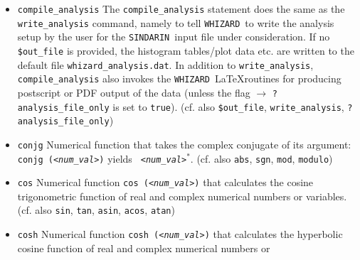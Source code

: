 \documentclass[12pt]{book}
\newcommand{\ttt}[1]{\texttt{#1}}
\newcommand{\whizard}{\ttt{WHIZARD}}
\newcommand{\sindarin}{\ttt{SINDARIN}}
\begin{document}
\begin{itemize}
\ttt{compile} \newline
The \ttt{compile ()} command has no arguments (the parentheses can
also been left out: /\ttt{compile ()}. The command is optional, it
invokes the compilation of the process(es) (i.e. the matrix element
file(s)) to be compiled as a shared library. This shared object file
has the standard name \ttt{default\_lib.so} and resides in the
\ttt{.libs} subdirectory of the corresponding user workspace. If the
user has defined a different library name \ttt{lib\_name} with the
\ttt{library} command, then WHIZARD compiles this as the shared object
\ttt{.libs/lib\_name.so}. (This allows to split process classes and to
avoid too large libraries.)
Another possibility is to use the command \ttt{compile as
  "static\_name"}. This will compile and link the process library in a
static way and create the static executable \ttt{static\_name} in the
user workspace. (cf. also \ttt{library})
\item
\ttt{compile\_analysis} \newline
The \ttt{compile\_analysis} statement does the same as
the \ttt{write\_analysis} command, namely to tell \whizard\ to write
the analysis setup by the user for the \sindarin\ input file under
consideration. If no \ttt{\$out\_file} is provided, the histogram
tables/plot data etc. are written to the default file
\ttt{whizard\_analysis.dat}. In addition to \ttt{write\_analysis},
\ttt{compile\_analysis} also invokes the \whizard\ \LaTeX routines for
producing postscript or PDF output of the data (unless the flag
$\rightarrow$ \ttt{?analysis\_file\_only} is set to \ttt{true}).
(cf. also \ttt{\$out\_file}, \ttt{write\_analysis},
\ttt{?analysis\_file\_only})
\item
\ttt{conjg} \newline
Numerical function that takes the complex conjugate of its argument:
\ttt{conjg ({\em <num\_val>})} yields \ttt{{\em
<num\_val>}$^\ast$}. (cf. also \ttt{abs}, \ttt{sgn}, \ttt{mod}, \ttt{modulo})
\item
\ttt{cos} \newline
Numerical function \ttt{cos ({\em <num\_val>})} that calculates the
cosine trigonometric function of real and complex numerical numbers or
variables. (cf. also \ttt{sin}, \ttt{tan}, \ttt{asin}, \ttt{acos},
\ttt{atan})
\item
\ttt{cosh} \newline
Numerical function \ttt{cosh ({\em <num\_val>})} that calculates the
hyperbolic cosine function of real and complex numerical numbers or

\end{itemize}
\end{document}
